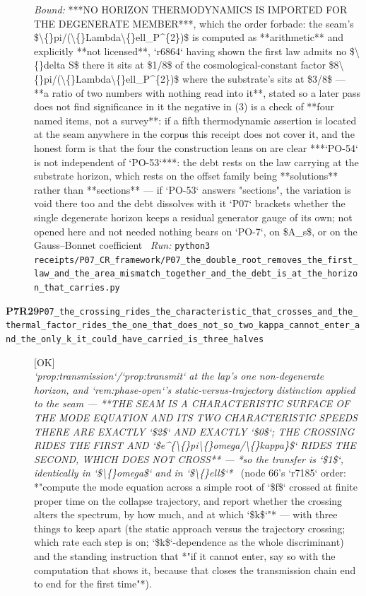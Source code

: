 \begin{description}
 \emph{Bound:}  ***NO HORIZON THERMODYNAMICS IS IMPORTED FOR THE DEGENERATE MEMBER***, which the order forbade: the seam's \$\textbackslash\{\}pi/(\textbackslash\{\}Lambda\textbackslash\{\}ell\_P\textasciicircum{}\{2\})\$ is computed as **arithmetic** and explicitly **not licensed**, `r6864` having shown the first law admits no \$\textbackslash\{\}delta S\$ there  it sits at \$1/8\$ of the cosmological-constant factor \$8\textbackslash\{\}pi/(\textbackslash\{\}Lambda\textbackslash\{\}ell\_P\textasciicircum{}\{2\})\$ where the substrate's sits at \$3/8\$ --- **a ratio of two numbers with nothing read into it**, stated so a later pass does not find significance in it  the negative in (3) is a check of **four named items, not a survey**: if a fifth thermodynamic assertion is located at the seam anywhere in the corpus this receipt does not cover it, and the honest form is that the four the construction leans on are clear  ***`PO-54` is not independent of `PO-53`***: the debt rests on the law carrying at the substrate horizon, which rests on the offset family being **solutions** rather than **sections** --- if `PO-53` answers "sections", the variation is void there too and the debt dissolves with it  `P07` brackets whether the single degenerate horizon keeps a residual generator gauge of its own; not opened here and not needed  nothing bears on `PO-7`, on \$A\_s\$, or on the Gauss--Bonnet coefficient
\ \emph{Run:} \texttt{python3 receipts/P07\_CR\_framework/P07\_the\_double\_root\_removes\_the\_first\_law\_and\_the\_area\_mismatch\_together\_and\_the\_debt\_is\_at\_the\_horizon\_that\_carries.py}
\item[\rcptlabel{P07_the_crossing_rides_the_characteristic_that_crosses_and_the_thermal_factor_rides_the_one_that_does_not_so_two_kappa_cannot_enter_and_the_only_k_it_could_have_carried_is_three_halves}{P7R29}\textbf{P7R29}\quad\texttt{P07\_the\_crossing\_rides\_the\_characteristic\_that\_crosses\_and\_the\_thermal\_factor\_rides\_the\_one\_that\_does\_not\_so\_two\_kappa\_cannot\_enter\_and\_the\_only\_k\_it\_could\_have\_carried\_is\_three\_halves}]\hfill\textsf{[OK]}\\
\textit{`prop:transmission`/`prop:transmit` at the lap's one non-degenerate horizon, and `rem:phase-open`'s static-versus-trajectory distinction applied to the seam ---  **THE SEAM IS A CHARACTERISTIC SURFACE OF THE MODE EQUATION AND ITS TWO CHARACTERISTIC SPEEDS THERE ARE EXACTLY `\$2\$` AND EXACTLY `\$0\$`; THE CROSSING RIDES THE FIRST AND `\$e\textasciicircum{}\{\textbackslash\{\}pi\textbackslash\{\}omega/\textbackslash\{\}kappa\}\$` RIDES THE SECOND, WHICH DOES NOT CROSS** --- *so the transfer is `\$1\$`, identically in `\$\textbackslash\{\}omega\$` and in `\$\textbackslash\{\}ell\$`*} \ (node 66's `r7185` order: *"compute the mode equation across a simple root of `\$f\$` crossed at finite proper time on the collapse trajectory, and report whether the crossing alters the spectrum, by how much, and at which `\$k\$`"* --- with three things to keep apart (the static approach versus the trajectory crossing; which rate each step is on; `\$k\$`-dependence as the whole discriminant) and the standing instruction that *"if it cannot enter, say so with the computation that shows it, because that closes the transmission chain end to end for the first time"*). 

\end{description}
